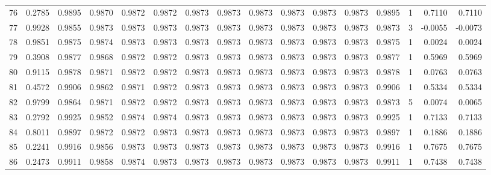 \begin{tabular}{lrrrrrrrrrrrrrrr}
76  &      0.2785 &  0.9895 &  0.9870 &  0.9872 &  0.9872 &  0.9873 &  0.9873 &  0.9873 &  0.9873 &  0.9873 &   0.9873 &     0.9895 &      1 &                    0.7110 &                     0.7110 \\
77  &      0.9928 &  0.9855 &  0.9873 &  0.9873 &  0.9873 &  0.9873 &  0.9873 &  0.9873 &  0.9873 &  0.9873 &   0.9873 &     0.9873 &      3 &                   -0.0055 &                    -0.0073 \\
78  &      0.9851 &  0.9875 &  0.9874 &  0.9873 &  0.9873 &  0.9873 &  0.9873 &  0.9873 &  0.9873 &  0.9873 &   0.9873 &     0.9875 &      1 &                    0.0024 &                     0.0024 \\
79  &      0.3908 &  0.9877 &  0.9868 &  0.9872 &  0.9872 &  0.9873 &  0.9873 &  0.9873 &  0.9873 &  0.9873 &   0.9873 &     0.9877 &      1 &                    0.5969 &                     0.5969 \\
80  &      0.9115 &  0.9878 &  0.9871 &  0.9872 &  0.9872 &  0.9873 &  0.9873 &  0.9873 &  0.9873 &  0.9873 &   0.9873 &     0.9878 &      1 &                    0.0763 &                     0.0763 \\
81  &      0.4572 &  0.9906 &  0.9862 &  0.9871 &  0.9872 &  0.9873 &  0.9873 &  0.9873 &  0.9873 &  0.9873 &   0.9873 &     0.9906 &      1 &                    0.5334 &                     0.5334 \\
82  &      0.9799 &  0.9864 &  0.9871 &  0.9872 &  0.9872 &  0.9873 &  0.9873 &  0.9873 &  0.9873 &  0.9873 &   0.9873 &     0.9873 &      5 &                    0.0074 &                     0.0065 \\
83  &      0.2792 &  0.9925 &  0.9852 &  0.9874 &  0.9874 &  0.9873 &  0.9873 &  0.9873 &  0.9873 &  0.9873 &   0.9873 &     0.9925 &      1 &                    0.7133 &                     0.7133 \\
84  &      0.8011 &  0.9897 &  0.9872 &  0.9872 &  0.9873 &  0.9873 &  0.9873 &  0.9873 &  0.9873 &  0.9873 &   0.9873 &     0.9897 &      1 &                    0.1886 &                     0.1886 \\
85  &      0.2241 &  0.9916 &  0.9856 &  0.9873 &  0.9873 &  0.9873 &  0.9873 &  0.9873 &  0.9873 &  0.9873 &   0.9873 &     0.9916 &      1 &                    0.7675 &                     0.7675 \\
86  &      0.2473 &  0.9911 &  0.9858 &  0.9874 &  0.9873 &  0.9873 &  0.9873 &  0.9873 &  0.9873 &  0.9873 &   0.9873 &     0.9911 &      1 &                    0.7438 &                     0.7438 \\

\end{tabular}
